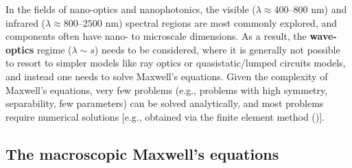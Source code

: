   In the fields of nano-optics and nanophotonics, the visible
  (\(\lambda \approx 400\)--\(800\) nm) and infrared (\(\lambda \approx 800\)--\(2500\)
  nm)
  spectral regions are most commonly explored, and components often have nano- to
  microscale dimensions. As a result, the \textbf{wave-optics} regime ($\lambda
      \sim s$) needs to be considered,
  where it is generally not possible to resort to simpler models like ray optics or
  quasistatic/lumped circuits models,
  and instead one needs to solve Maxwell's equations. Given the complexity of
  Maxwell's
  equations, very few problems (e.g., problems with high symmetry, separability,
  few parameters)
  can be solved analytically, and most problems require
  numerical solutions [e.g., obtained via the finite element method ()].

\subsection*{The macroscopic Maxwell's equations}

